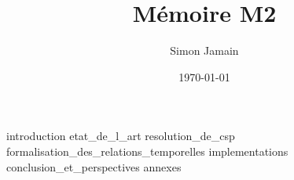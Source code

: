 \documentclass{report}
\title{Mémoire M2}
\author{Simon Jamain}
\date{\today}
\begin{document}
\maketitle

\tableofcontents

{introduction}
{etat_de_l_art}
{resolution_de_csp}
{formalisation_des_relations_temporelles}
{implementations}
{conclusion_et_perspectives}
\appendix
{annexes}
%
%

\printbibliography
\end{document}
